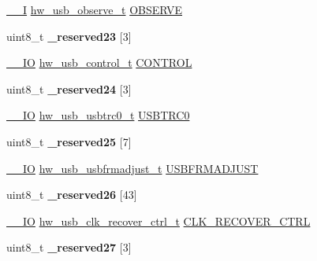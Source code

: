 \begin{DoxyCompactItemize}
\item 
\hyperlink{core__sc300_8h_af63697ed9952cc71e1225efe205f6cd3}{\+\_\+\+\_\+I} \hyperlink{union__hw__usb__observe}{hw\+\_\+usb\+\_\+observe\+\_\+t} \hyperlink{struct__hw__usb_ac0fc8aa8bb1e051cda250cc64d4fa7d3}{O\+B\+S\+E\+R\+VE}
\item 
uint8\+\_\+t {\bfseries \+\_\+reserved23} \mbox{[}3\mbox{]}\hypertarget{struct__hw__usb_ae911719ea2b69cf1456efd16d2fc1508}{}\label{struct__hw__usb_ae911719ea2b69cf1456efd16d2fc1508}

\item 
\hyperlink{core__sc300_8h_aec43007d9998a0a0e01faede4133d6be}{\+\_\+\+\_\+\+IO} \hyperlink{union__hw__usb__control}{hw\+\_\+usb\+\_\+control\+\_\+t} \hyperlink{struct__hw__usb_aac7333660923df50d5ebf4622d645621}{C\+O\+N\+T\+R\+OL}
\item 
uint8\+\_\+t {\bfseries \+\_\+reserved24} \mbox{[}3\mbox{]}\hypertarget{struct__hw__usb_ae75a042340812548e5bed07ad8c52690}{}\label{struct__hw__usb_ae75a042340812548e5bed07ad8c52690}

\item 
\hyperlink{core__sc300_8h_aec43007d9998a0a0e01faede4133d6be}{\+\_\+\+\_\+\+IO} \hyperlink{union__hw__usb__usbtrc0}{hw\+\_\+usb\+\_\+usbtrc0\+\_\+t} \hyperlink{struct__hw__usb_a99bb46d5519be3d10cb467e306e56935}{U\+S\+B\+T\+R\+C0}
\item 
uint8\+\_\+t {\bfseries \+\_\+reserved25} \mbox{[}7\mbox{]}\hypertarget{struct__hw__usb_a3a3907b7372ba7424f8cc5c5f1200f6c}{}\label{struct__hw__usb_a3a3907b7372ba7424f8cc5c5f1200f6c}

\item 
\hyperlink{core__sc300_8h_aec43007d9998a0a0e01faede4133d6be}{\+\_\+\+\_\+\+IO} \hyperlink{union__hw__usb__usbfrmadjust}{hw\+\_\+usb\+\_\+usbfrmadjust\+\_\+t} \hyperlink{struct__hw__usb_abfb008e478f61789a4bbf3f25b538929}{U\+S\+B\+F\+R\+M\+A\+D\+J\+U\+ST}
\item 
uint8\+\_\+t {\bfseries \+\_\+reserved26} \mbox{[}43\mbox{]}\hypertarget{struct__hw__usb_abb64e733e02cd4bc8f9f87469c7130a8}{}\label{struct__hw__usb_abb64e733e02cd4bc8f9f87469c7130a8}

\item 
\hyperlink{core__sc300_8h_aec43007d9998a0a0e01faede4133d6be}{\+\_\+\+\_\+\+IO} \hyperlink{union__hw__usb__clk__recover__ctrl}{hw\+\_\+usb\+\_\+clk\+\_\+recover\+\_\+ctrl\+\_\+t} \hyperlink{struct__hw__usb_a5b0ac90e42c9094303c6ffaa0c3d0fb0}{C\+L\+K\+\_\+\+R\+E\+C\+O\+V\+E\+R\+\_\+\+C\+T\+RL}
\item 
uint8\+\_\+t {\bfseries \+\_\+reserved27} \mbox{[}3\mbox{]}\hypertarget{struct__hw__usb_ad06ed36fc1f53bcda2d57487101e0e67}{}\label{struct__hw__usb_ad06ed36fc1f53bcda2d57487101e0e67}


\end{DoxyCompactItemize}
